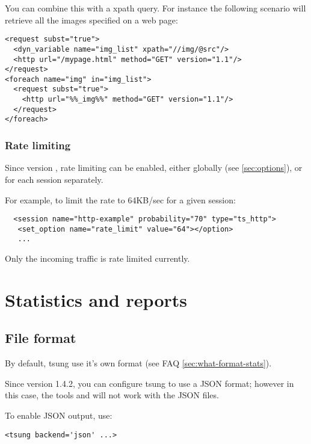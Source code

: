 \documentclass{TSUNG-en}
\begin{document}
You can combine this with a xpath query. For instance the following scenario will retrieve all the images specified on a web page:

\begin{Verbatim}
<request subst="true">
  <dyn_variable name="img_list" xpath="//img/@src"/>
  <http url="/mypage.html" method="GET" version="1.1"/>
</request>
<foreach name="img" in="img_list">
  <request subst="true">
    <http url="%%_img%%" method="GET" version="1.1"/>
  </request>
</foreach>
\end{Verbatim}

\subsubsection{Rate limiting}

Since version , rate limiting can be enabled, either globally
(see \ref{sec:options}), or for each session separately. 

For example, to limit the rate to 64KB/sec for a given session:
\begin{Verbatim}
  <session name="http-example" probability="70" type="ts_http">
   <set_option name="rate_limit" value="64"></option>
   ...
\end{Verbatim}

Only the incoming traffic is rate limited currently.

\section{Statistics and reports}
\label{sec:statistics-reports}
\subsection{File format}

By default, tsung use it's own format (see FAQ \ref{sec:what-format-stats}).

Since version 1.4.2, you can configure tsung to use a JSON format;
however in this case, the tools  and
 will not work with the JSON files.

To enable JSON output, use:
\begin{Verbatim}
<tsung backend='json' ...>
\end{Verbatim}
\end{document}
